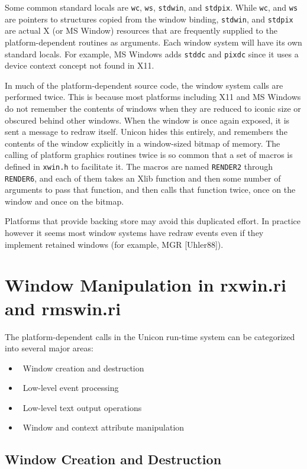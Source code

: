 Some common standard locals are \texttt{wc}, \texttt{ws},
\texttt{stdwin}, and \texttt{stdpix}. While \texttt{wc}, and
\texttt{ws} are pointers to structures copied from the window binding,
\texttt{stdwin}, and \texttt{stdpix} are actual X (or MS Window)
resources that are frequently supplied to the platform-dependent
routines as arguments. Each window system will have its own standard
locals. For example, MS Windows adds \texttt{stddc} and \texttt{pixdc}
since it uses a device context concept not found in X11.

In much of the platform-dependent source code, the window system calls
are performed twice. This is because most platforms including X11 and MS
Windows do not remember the contents of
windows when they are reduced to iconic size or obscured behind other
windows. When the window is once again exposed, it is sent a message
to redraw itself. Unicon hides this entirely, and remembers the
contents of the window explicitly in a window-sized bitmap of
memory. The calling of platform graphics routines twice is so common
that a set of macros is defined in \texttt{xwin.h} to facilitate it.
The macros are named \texttt{RENDER2} through \texttt{RENDER6}, and
each of them takes an Xlib function and then some number of arguments
to pass that function, and then calls that function twice, once on the
window and once on the bitmap.

Platforms that provide backing store may avoid this duplicated
effort. In practice however it seems most window systems have redraw
events even if they implement retained windows (for example, MGR
[Uhler88]).

\section{Window Manipulation in rxwin.ri and rmswin.ri}

The platform-dependent calls in the Unicon run-time system can be
categorized into several major areas:

\liststyleLxlv
\begin{itemize}
\item 
\ Window creation and destruction
\item 
\ Low-level event processing
\item 
\ Low-level text output operations
\item 
\ Window and context attribute manipulation
\end{itemize}

\subsection{Window Creation and Destruction}

